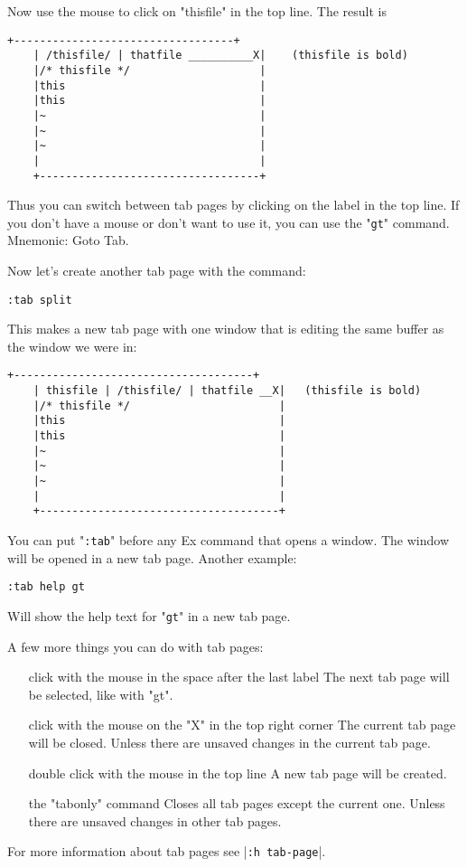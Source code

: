 Now use the mouse to click on "thisfile" in the top line.
The result is

		\begin{Verbatim}[samepage=true]
    +----------------------------------+
    | /thisfile/ | thatfile __________X|    (thisfile is bold)
    |/* thisfile */                    |
    |this                              |
    |this                              |
    |~                                 |
    |~                                 |
    |~                                 |
    |                                  |
    +----------------------------------+
						\end{Verbatim}

Thus you can switch between tab pages by clicking on the label in the top line.
If you don't have a mouse or don't want to use it, you can use the "\texttt{gt}" command.
Mnemonic: Goto Tab.

Now let's create another tab page with the command:

 \begin{Verbatim}[samepage=true]
 :tab split
 \end{Verbatim}

This makes a new tab page with one window that is editing the same buffer as the window we were in:

\begin{Verbatim}[samepage=true]
    +-------------------------------------+
    | thisfile | /thisfile/ | thatfile __X|   (thisfile is bold)
    |/* thisfile */                       |
    |this                                 |
    |this                                 |
    |~                                    |
    |~                                    |
    |~                                    |
    |                                     |
    +-------------------------------------+
\end{Verbatim}

You can put "\texttt{:tab}" before any Ex command that opens a window.
The window will be opened in a new tab page.
Another example:

 \begin{Verbatim}[samepage=true]
 :tab help gt
 \end{Verbatim}

Will show the help text for "\texttt{gt}" in a new tab page.

A few more things you can do with tab pages:
\begin{itemize}
	\item [click with the mouse in the space after the last label] The next tab page will be selected, like with "gt".
	\item [click with the mouse on the "X" in the top right corner] The current tab page will be closed.
								Unless there are unsaved changes in the current tab page.
							\item [double click with the mouse in the top line] A new tab page will be created.
							\item [the "tabonly" command] Closes all tab pages except the current one.
								Unless there are unsaved changes in other tab pages.
\end{itemize}
For more information about tab pages see |\texttt{:h tab-page}|.
\clearpage
